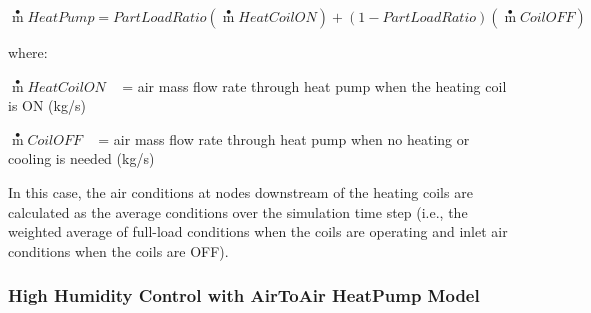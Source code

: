 \begin{equation}
\mathop m\limits^ \bullet  HeatPump = PartLoadRatio\left( {\mathop m\limits^ \bullet  HeatCoilON} \right) + \left( {1 - PartLoadRatio} \right)\left( {\mathop m\limits^ \bullet  CoilOFF} \right)
\end{equation}

where:

\(\mathop m\limits^ \bullet HeatCoilON\) ~ = air mass flow rate through heat pump when the heating coil is ON (kg/s)

\(\mathop m\limits^ \bullet CoilOFF\) ~ = air mass flow rate through heat pump when no heating or cooling is needed (kg/s)

In this case, the air conditions at nodes downstream of the heating coils are calculated as the average conditions over the simulation time step (i.e., the weighted average of full-load conditions when the coils are operating and inlet air conditions when the coils are OFF).

\subsubsection{High Humidity Control with AirToAir HeatPump Model}\label{high-humidity-control-with-airtoair-heatpump-model}

